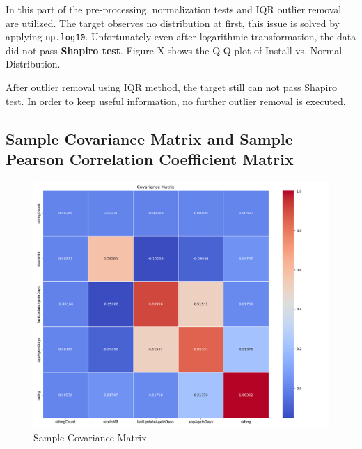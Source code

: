 In this part of the pre-processing, normalization tests and IQR outlier removal are utilized. The target observes no distribution at first, this issue is solved by applying \texttt{np.log10}. Unfortunately even after logarithmic transformation, the data did not pass \textbf{Shapiro test}. Figure X shows the Q-Q plot of Install vs. Normal Distribution. 

After outlier removal using IQR method, the target still can not pass Shapiro test. In order to keep useful information, no further outlier removal is executed.


\subsection{Sample Covariance Matrix and Sample Pearson Correlation Coefficient Matrix}

\begin{figure}[h]
\centering
\includegraphics[width=\textwidth]{docs//assets/cov.png}
\caption{Sample Covariance Matrix}
\end{figure}

